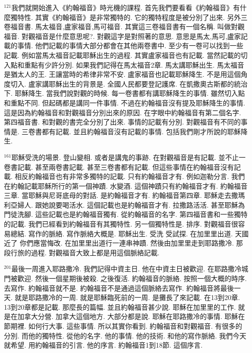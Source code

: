 \documentclass{book}
\begin{document}
$^{121}$我們就開始進入《約翰福音》時光機的課程.
首先我們要看看《約翰福音》有什麼獨特性.
其實《約翰福音》是非常獨特的.
它的獨特程度是被分別了出來.
另外三卷福音書.
馬太福音,盧家福音,馬可福音.
其實這三卷福音書有一個名稱.
叫做對觀福音.
對觀福音是什麼意思呢?.
對觀這字是對照著的意思.
意思是馬太,馬可,盧家記載的事情.
他們記載的事情大部分都會在其他兩卷書中.
至少有一卷可以找到一些記載.
例如當馬太福音記載耶穌出生的過程.
其實盧家福音也有記載.
當然記載的切入點和重點有少許分別.
如果我們記得在馬太福音2章.
馬太講耶穌出生.
馬太福音是猶太人的王.
王讓當時的希律非常不安.
盧家福音也記載耶穌降生.
不是用這個角度切入.
盧家講耶穌出生的背景是.
全國人民都要登記護席.
在凱撒奧古斯都的統治下.
耶穌降生.
當我們說對觀的時候.
每一卷書都有講耶穌降生的事情.
雖然切入點和重點不同.
但起碼都是講同一件事情.
不過在約翰福音沒有提及耶穌降生的事情.
這是因為約翰福音和對觀福音分別出來的原因.
在字眼中約翰福音有第二個名字.
第四福音書.
和對觀的書完全分別了出來.
事情的記載有分別.
對觀福音有不同的事情是.
三卷書都有記載.
並且約翰福音沒有記載的事情.
包括我們剛才所說的耶穌降生.

$^{161}$耶穌受洗的場景.
登山變相.
或者是講鬼的事跡.
在對觀福音是有記載.
並不止一卷書記載.
甚至兩卷書記載.
甚至三卷書都有記載.
但這些事情在約翰福音沒有記載.
相反約翰福音也有非常多獨特的記載.
只有約翰福音才有.
例如迦勒分言.
我們在約翰記載耶穌所行的第一個神蹟.
水變酒.
這個神蹟只有約翰福音才有.
約翰福音三章.
當耶穌與尼哥底母的對話.
是約翰福音才有.
約翰福音第四章.
耶穌走去撒瑪利亞婦人.
跟她說要喝活水.
這個記載也是約翰福音才有.
拉撒路活活.
甚至耶穌為門徒洗腳.
這些記載也是約翰福音獨有.
從約翰福音的名字.
第四福音書和一些獨特的記載.
我們已經看到約翰福音有其獨特性.
另一個獨特性是.
排序.
對觀福音很容易總結.
寫作的脈絡.
寫作脈絡大概是.
耶穌出生.
受洗 受試探.
在加里里出道.
天國近了 你們應當悔改.
在加里里出道行一連串神蹟.
然後由加里里走到耶路撒冷.
那段行旅的過程.
對觀福音大致上都是用這個脈絡記載.

$^{201}$最後一周進入耶路撒冷.
我們記得中資主日.
他在中資主日被歡迎.
在耶路撒冷城門被歡迎.
然後一個星期後被殺.
之後復活.
約翰福音的脈絡.
按照一個大概的時序.
去寫作.
約翰福音就不是.
約翰福音不是通過這個脈絡去寫作.
約翰福音將最後一天.
就是耶路撒冷的一周.
就是耶穌臨死前的一周.
是攤長了來記載.
在13到20章.
13到20章都是記載.
那麼長的篇幅.
並且約翰福音甚少說.
耶穌在加里里的工作.
就是在加拿大分營.
加拿大這個地方.
大部分都是說.
耶穌在耶路撒冷的事情.
耶穌在節期裡.
如何行大事.
這些事情.
所以其實你看到.
約翰福音和對觀福音.
有很多的分別.
而他的獨特性.
從他的名字.
他的事情.
他的技術.
和他的寫作脈絡.
我們今天就希望.
用約翰福音的引言.
他的序言.
約翰福音1到18節.
這個序言.
\end{document}
